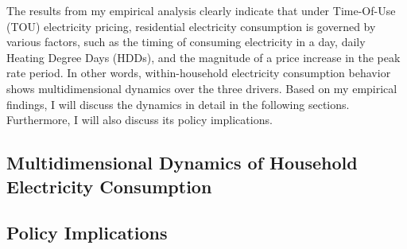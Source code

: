 The results from my empirical analysis clearly indicate that under Time-Of-Use (TOU) electricity pricing, residential electricity consumption is governed by various factors, such as the timing of consuming electricity in a day, daily Heating Degree Days (HDDs), and the magnitude of a price increase in the peak rate period. In other words, within-household electricity consumption behavior shows multidimensional dynamics over the three drivers. Based on my empirical findings, I will discuss the dynamics in detail in the following sections. Furthermore, I will also discuss its policy implications. 


\subsection{Multidimensional Dynamics of Household Electricity Consumption}
\label{Subsection:Multidimensional-Dynamics-of-Household-Electricity-Consumption}



\subsection{Policy Implications}
\label{Subsection:Policy-Implications}


